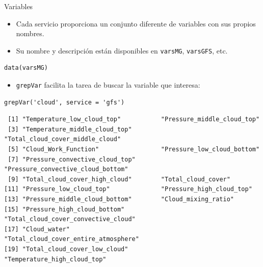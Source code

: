 \documentclass[xcolor={usenames,svgnames,dvipsnames}]{beamer}
\begin{document}
\begin{frame}[fragile,label=sec-2-1]{Variables}
 \begin{itemize}
\item Cada servicio proporciona un conjunto diferente de variables con sus
propios nombres.
\item Su nombre y descripción están disponibles en \texttt{varsMG}, \texttt{varsGFS},
etc.
\end{itemize}
\lstset{language=R,label= ,caption= ,numbers=none}
\begin{lstlisting}
data(varsMG)
\end{lstlisting}
\begin{itemize}
\item \texttt{grepVar} facilita la tarea de buscar la variable que interesa:
\end{itemize}

\lstset{language=R,label= ,caption= ,numbers=none}
\begin{lstlisting}
grepVar('cloud', service = 'gfs')
\end{lstlisting}

\begin{verbatim}
 [1] "Temperature_low_cloud_top"           "Pressure_middle_cloud_top"          
 [3] "Temperature_middle_cloud_top"        "Total_cloud_cover_middle_cloud"     
 [5] "Cloud_Work_Function"                 "Pressure_low_cloud_bottom"          
 [7] "Pressure_convective_cloud_top"       "Pressure_convective_cloud_bottom"   
 [9] "Total_cloud_cover_high_cloud"        "Total_cloud_cover"                  
[11] "Pressure_low_cloud_top"              "Pressure_high_cloud_top"            
[13] "Pressure_middle_cloud_bottom"        "Cloud_mixing_ratio"                 
[15] "Pressure_high_cloud_bottom"          "Total_cloud_cover_convective_cloud" 
[17] "Cloud_water"                         "Total_cloud_cover_entire_atmosphere"
[19] "Total_cloud_cover_low_cloud"         "Temperature_high_cloud_top"
\end{verbatim}
\end{frame}
\end{document}
